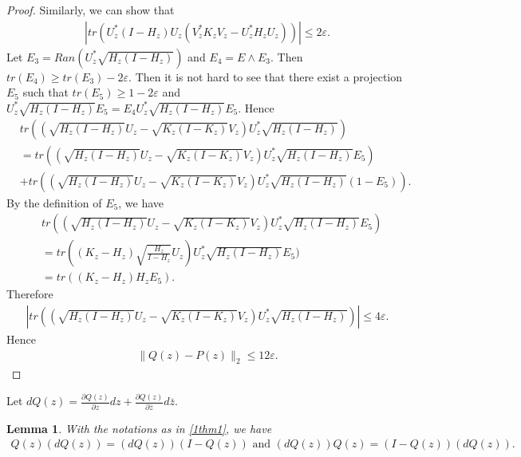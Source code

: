 \documentclass[a4paper,10pt]{amsart}
\newtheorem{lemma}{Lemma}[section]
\begin{document}
\begin{proof}
    Similarly, we can show that
    \begin{align*}
      |tr(U^{*}_{z}(I-H_z)U_{z}(V^{*}_{z}K_{z}V_{z} - U^{*}_{z}H_{z}U_{z}))|
        \leq 2\varepsilon.
    \end{align*}
    Let $E_3 = Ran( U^{*}_{z}\sqrt{H_{z}(I-H_{z})})$ and 
    $E_4 = E \wedge E_3$. Then
    $tr(E_4) \geq tr(E_3) - 2\varepsilon$.
    Then it is not hard to see that there exist a projection
    $E_5$ such that $tr(E_5) \geq 1 - 2\varepsilon$ and 
    $U^{*}_{z}\sqrt{H_{z}(I-H_{z})}E_5 
    = E_4U^{*}_{z}\sqrt{H_{z}(I-H_{z})}E_5$. Hence
    \begin{align*}
        &tr((\sqrt{H_{z}(I-H_{z})}U_{z}
        - \sqrt{K_{z}(I-K_{z})}V_{z})U^{*}_{z}\sqrt{H_{z}(I-H_{z})})\\
        &= tr((\sqrt{H_{z}(I-H_{z})}U_{z}
        - \sqrt{K_{z}(I-K_{z})}V_{z})U^{*}_{z}\sqrt{H_{z}(I-H_{z})}E_5)\\
        &+ tr((\sqrt{H_{z}(I-H_{z})}U_{z}
        - \sqrt{K_{z}(I-K_{z})}V_{z})U^{*}_{z}\sqrt{H_{z}(I-H_{z})}(1-E_5)).
    \end{align*}
    By the definition of $E_5$, we have
    \begin{align*}
        &tr((\sqrt{H_{z}(I-H_{z})}U_{z}
        - \sqrt{K_{z}(I-K_{z})}V_{z})U^{*}_{z}\sqrt{H_{z}(I-H_{z})}E_5)\\
        &= tr((K_z - H_z)\sqrt{\frac{H_{z}}{I-H_{z}}}U_{z}
        )U^{*}_{z}\sqrt{H_{z}(I-H_{z})}E_5) \\
        &= tr((K_z - H_z)H_z E_5).
    \end{align*}
    Therefore
    \begin{align*}
        |tr((\sqrt{H_{z}(I-H_{z})}U_{z}
        - \sqrt{K_{z}(I-K_{z})}V_{z})U^{*}_{z}\sqrt{H_{z}(I-H_{z})})|
        \leq 4 \varepsilon.
    \end{align*}
    Hence
    \begin{align*}
        \|Q(z) - P(z)\|_2 \leq 12\varepsilon.
    \end{align*}
\end{proof}


Let $dQ(z) = \frac{\partial Q(z)}{\partial z}dz + 
\frac{\partial Q(z)}{\partial \bar{z}}d\bar{z}$.

\begin{lemma}
    With the notations as in \cref{1thm1}, we have
    \begin{align*}
        Q(z)(dQ(z)) = (dQ(z))(I-Q(z)) \mbox{ and } 
        (dQ(z))Q(z) = (I-Q(z))(dQ(z)).
    \end{align*}
\end{lemma}
\end{document}
